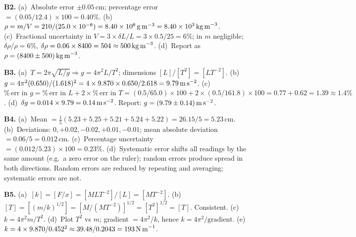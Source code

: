 \textbf{B2.}
(a)~Absolute error $\pm0.05\,\text{cm}$; percentage
error $=(0.05/12.4)\times100=0.40\%$. \quad
(b)~$\rho=m/V=210/(25.0\times10^{-6})
=8.40\times10^{6}\,\text{g\,m}^{-3}
=8.40\times10^{3}\,\text{kg\,m}^{-3}$. \quad
(c)~Fractional uncertainty in $V=3\times\delta L/L
=3\times0.5/25=6\%$; in $m$ negligible;
$\delta\rho/\rho=6\%$,
$\delta\rho=0.06\times8400=504
\approx500\,\text{kg\,m}^{-3}$. \quad
(d)~Report as $\rho=(8400\pm500)\,\text{kg\,m}^{-3}$.

\textbf{B3.}
(a)~$T=2\pi\sqrt{L/g}\Rightarrow
g=4\pi^{2}L/T^{2}$; dimensions $[L]/[T^{2}]=[LT^{-2}]$.
\checkmark \quad
(b)~$g=4\pi^{2}(0.650)/(1.618)^{2}
=4\times9.870\times0.650/2.618
=9.79\,\text{m\,s}^{-2}$. \quad
(c)~$\%\,\text{err in }g
=\%\,\text{err in }L + 2\times\%\,\text{err in }T
=(0.5/65.0)\times100+2\times(0.5/161.8)\times100
=0.77+0.62=1.39\approx1.4\%$. \quad
(d)~$\delta g=0.014\times9.79=0.14\,\text{m\,s}^{-2}$.
Report: $g=(9.79\pm0.14)\,\text{m\,s}^{-2}$.

\textbf{B4.}
(a)~Mean $=\frac{1}{5}(5.23+5.25+5.21+5.24+5.22)
=26.15/5=5.23\,\text{cm}$. \quad
(b)~Deviations: $0,+0.02,-0.02,+0.01,-0.01$;
mean absolute deviation $=0.06/5=0.012\,\text{cm}$.
\quad
(c)~Percentage uncertainty $=(0.012/5.23)\times100
=0.23\%$. \quad
(d)~Systematic error shifts all readings by the same
amount (e.g.\ a zero error on the ruler); random errors
produce spread in both directions. Random errors are
reduced by repeating and averaging; systematic errors
are not.

\textbf{B5.}
(a)~$[k]=[F/x]=[MLT^{-2}]/[L]=[MT^{-2}]$. \quad
(b)~$[T]=[(m/k)^{1/2}]=[M/(MT^{-2})]^{1/2}=[T^{2}]^{1/2}
=[T]$. Consistent. \quad
(c)~$k=4\pi^{2}m/T^{2}$. \quad
(d)~Plot $T^{2}$ vs $m$; gradient $=4\pi^{2}/k$,
hence $k=4\pi^{2}/\text{gradient}$. \quad
(e)~$k=4\times9.870/0.452^{2}
\approx39.48/0.2043=193\,\text{N\,m}^{-1}$.

\endgroup


